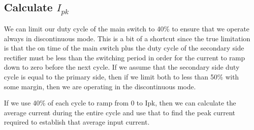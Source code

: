 \documentclass{article}
\begin{document}
\subsection{Calculate $I_{pk}$}

We can limit our duty cycle of the main switch to 40\% to ensure that we operate always in discontinuous mode.  This is a bit of a shortcut
since the true limitation is that the on time of the main switch plus the
duty cycle of the secondary side rectifier must be less than the switching
period in order for the current to ramp down to zero before the next cycle.
If we assume that the secondary side duty cycle is equal to the primary side,
then if we limit both to less than 50\% with some margin, then we are
operating in the discontinuous mode.

If we use 40\% of each cycle to ramp from 0 to Ipk, then we can
calculate the average current during the entire cycle and use that to find
the peak current required to establish that average input current.

%
%
%
\end{document}
